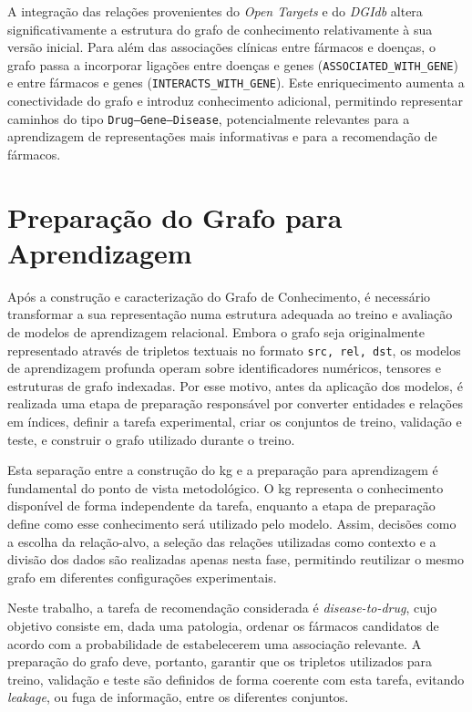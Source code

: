 A integração das relações provenientes do \emph{Open Targets} e do \emph{DGIdb} altera significativamente a estrutura do grafo de conhecimento relativamente à sua versão inicial. Para além das associações clínicas entre fármacos e doenças, o grafo passa a incorporar ligações entre doenças e genes (\texttt{ASSOCIATED\_WITH\_GENE}) e entre fármacos e genes (\texttt{INTERACTS\_WITH\_GENE}). Este enriquecimento aumenta a conectividade do grafo e introduz conhecimento adicional, permitindo representar caminhos do tipo \texttt{Drug--Gene--Disease}, potencialmente relevantes para a aprendizagem de representações mais informativas e para a recomendação de fármacos.

\section{Preparação do Grafo para Aprendizagem}
\label{sec:preparacao-grafo-aprendizagem}
Após a construção e caracterização do Grafo de Conhecimento, é necessário transformar a sua representação numa estrutura adequada ao treino e avaliação de modelos de aprendizagem relacional. Embora o grafo seja originalmente representado através de tripletos textuais no formato \texttt{src, rel, dst}, os modelos de aprendizagem profunda operam sobre identificadores numéricos, tensores e estruturas de grafo indexadas. Por esse motivo, antes da aplicação dos modelos, é realizada uma etapa de preparação responsável por converter entidades e relações em índices, definir a tarefa experimental, criar os conjuntos de treino, validação e teste, e construir o grafo utilizado durante o treino.

Esta separação entre a construção do \acrshort{kg} e a preparação para aprendizagem é fundamental do ponto de vista metodológico. O \acrshort{kg} representa o conhecimento disponível de forma independente da tarefa, enquanto a etapa de preparação define como esse conhecimento será utilizado pelo modelo. Assim, decisões como a escolha da relação-alvo, a seleção das relações utilizadas como contexto e a divisão dos dados são realizadas apenas nesta fase, permitindo reutilizar o mesmo grafo em diferentes configurações experimentais.

Neste trabalho, a tarefa de recomendação considerada é \emph{disease-to-drug}, cujo objetivo consiste em, dada uma patologia, ordenar os fármacos candidatos de acordo com a probabilidade de estabelecerem uma associação relevante. A preparação do grafo deve, portanto, garantir que os tripletos utilizados para treino, validação e teste são definidos de forma coerente com esta tarefa, evitando \emph{leakage}, ou fuga de informação, entre os diferentes conjuntos.

